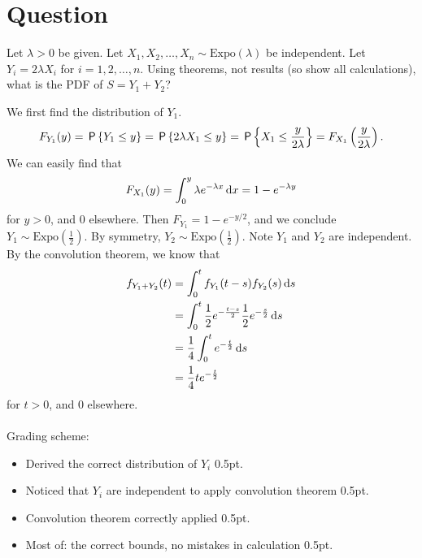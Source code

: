 \section*{Question}

\begin{exercise}[2]
Let $\lambda>0$ be given. Let $X_1,X_2,\dots,X_n \sim\text{Expo}(\lambda)$ be independent. Let $Y_i = 2\lambda X_i$ for $i=1,2,\dots,n$. Using theorems, not results (so show all calculations), what is the PDF of $S = Y_1 + Y_2$?
\begin{solution}
We first find the distribution of $Y_1$.
\begin{align*}
    F_{Y_1}(y) = \P{Y_1\leq y} = \P{2\lambda X_1\leq y} = \P{X_1\leq \frac{y}{2\lambda}} = F_{X_1}\left(\frac{y}{2\lambda}\right).
\end{align*}
We can easily find that
\begin{align*}
    F_{X_1}(y) = \int_0^y{\lambda e^{-\lambda x} \d x} = 1- e^{-\lambda y}
\end{align*}
for $y>0$, and 0 elsewhere. Then $F_{Y_1} = 1- e^{- y/2}$, and we conclude $Y_1\sim\text{Expo}(\frac12)$. By symmetry, $Y_2\sim\text{Expo}(\frac12)$. Note $Y_1$ and $Y_2$ are independent. By the convolution theorem, we know that
\begin{align*}
    f_{Y_1+Y_2}(t) &= \int_0^t{f_{Y_1}(t-s)f_{Y_2}(s) \d s}\\
    &= \int_0^t{\frac12 e^{-\frac{t-s}{2}}\frac12 e^{-\frac s 2} \d s}\\
    &= \frac14\int_0^t{e^{-\frac t 2} \d s}\\
    &= \frac14 t e^{-\frac t 2}
\end{align*}
for $t>0$, and 0 elsewhere.
\\\\
Grading scheme:
\begin{itemize}
    \item Derived the correct distribution of $Y_i$ 0.5pt.
    \item Noticed that $Y_i$ are independent to apply convolution theorem 0.5pt.
    \item Convolution theorem correctly applied 0.5pt.
    \item Most of: the correct bounds, no mistakes in calculation 0.5pt.
\end{itemize}
\end{solution}
\end{exercise}

